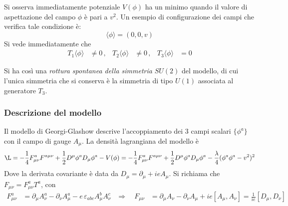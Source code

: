 Si osserva immediatamente potenziale $V(\phi)$ ha un minimo quando il valore di
aspettazione del campo $\phi$ è pari a $v^2$. Un esempio di configurazione dei
campi che verifica tale condizione è:
   $$ \langle \phi \rangle = (0,0,v) $$
Si vede immediatamente che
\begin{equation}
   \begin{aligned}
      T_1 \langle \phi \rangle & \neq 0 \, , &
      T_2 \langle \phi \rangle & \neq 0 \, , &
      T_3 \langle \phi \rangle & = 0
   \end{aligned}
\end{equation}

Si ha così una \emph{rottura spontanea della simmetria} $SU(2)$ del modello, di cui l'unica
simmetria che si conserva è la simmetria di tipo $U(1)$ associata al generatore $T_3$.\\
\subsubsection{Descrizione del modello}
Il modello di Georgi-Glashow descrive l'accoppiamento dei 3 campi scalari
$\{\phi^a\}$ con il campo di gauge $A_\mu$. La densità lagrangiana del modello è
\begin{equation}
   \L = - \frac{1}{4} F^a_{\mu\nu}F^{a\mu\nu}
                 + \frac{1}{2} D^\mu\phi^a D_\mu \phi^a - V(\phi)
               = - \frac{1}{4} F^a_{\mu\nu}F^{a\mu\nu}
                 + \frac{1}{2} D^\mu\phi^a D_\mu \phi^a
                 - \frac{\lambda}{4}( \phi^a\phi^a - v^2 )^2
\end{equation}
Dove la derivata covariante è data da $D_\mu = \partial _\mu + ie A_\mu$.
Si richiama che $F_{\mu\nu} = F^a_{\mu\nu} T^a$, con
\begin{equation}
   \begin{aligned}
   F^a_{\mu\nu} & = \partial _\mu A_\nu^a - \partial _\nu A^a_\mu
                   - e \, \varepsilon_{abc} A_\mu^b A_\nu^c
   & \Rightarrow \quad
   F_{\mu\nu}  & = \partial _\mu A_\nu - \partial _\nu A_\mu + ie [A_\mu,A_\nu]
                = \frac{1}{ie}[D_\mu , D_\nu]
  \end{aligned}
\end{equation}

